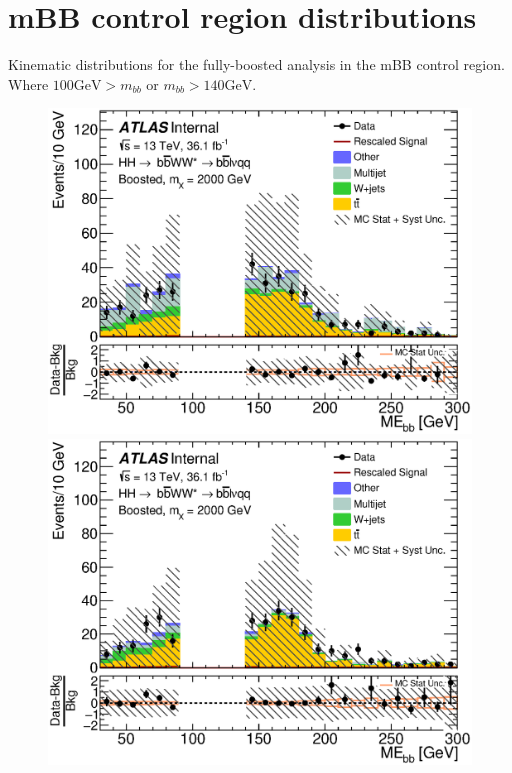 \chapter{mBB control region distributions}
\label{app:fully_mbb_plots}
Kinematic distributions for the fully-boosted analysis in the mBB control region. Where ${100 \mathrm{GeV} > m_{bb}}$ or ${m_{bb} > 140 \mathrm{GeV}}$.
\begin{figure}[h]
\begin{center}
\includegraphics[scale=0.33]{figures/kinplots/new/C_2tag_mbbcr_elec_presel_met50_HbbMass}
\includegraphics[scale=0.33]{figures/kinplots/new/C_2tag_mbbcr_muon_presel_met50_HbbMass}\\

\end{center}
\end{figure}
